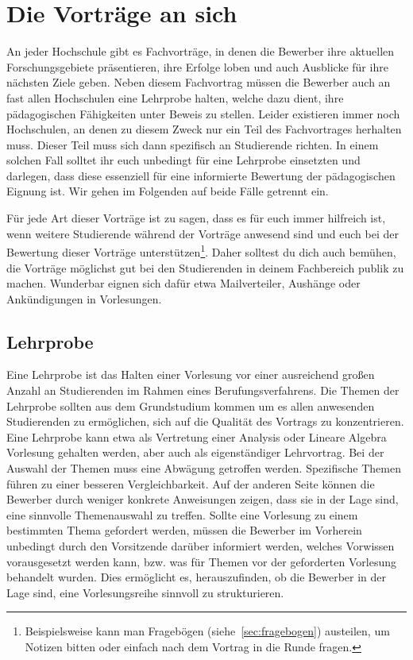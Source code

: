 \section{Die Vorträge an sich}
An jeder Hochschule gibt es Fachvorträge, in denen die Bewerber ihre aktuellen Forschungsgebiete präsentieren, ihre Erfolge loben und auch Ausblicke für ihre nächsten Ziele geben. Neben diesem Fachvortrag müssen die Bewerber auch an fast allen Hochschulen eine Lehrprobe halten, welche dazu dient, ihre pädagogischen Fähigkeiten unter Beweis zu stellen. Leider existieren immer noch Hochschulen, an denen zu diesem Zweck nur ein Teil des Fachvortrages herhalten muss. Dieser Teil muss sich dann spezifisch an Studierende richten. In einem solchen Fall solltet ihr euch unbedingt für eine Lehrprobe einsetzten und darlegen, dass diese essenziell für eine informierte Bewertung der pädagogischen Eignung ist. Wir gehen im Folgenden auf beide Fälle getrennt ein.

Für jede Art dieser Vorträge ist zu sagen, dass es für euch immer hilfreich ist, wenn weitere Studierende während der Vorträge anwesend sind und euch bei der Bewertung dieser Vorträge unterstützen\footnote{Beispielsweise kann man Fragebögen (siehe~\ref{sec:fragebogen}) austeilen, um Notizen bitten oder einfach nach dem Vortrag in die Runde fragen.}. Daher solltest du dich auch bemühen, die Vorträge möglichst gut bei den Studierenden in deinem Fachbereich publik zu machen. Wunderbar eignen sich dafür etwa Mailverteiler, Aushänge oder Ankündigungen in Vorlesungen.

\subsection{Lehrprobe}
Eine Lehrprobe ist das Halten einer Vorlesung vor einer ausreichend großen Anzahl an Studierenden im Rahmen eines Berufungsverfahrens. Die Themen der Lehrprobe sollten aus dem Grundstudium kommen um es allen anwesenden Studierenden zu ermöglichen, sich auf die Qualität des Vortrags zu konzentrieren. Eine Lehrprobe kann etwa als Vertretung einer Analysis oder Lineare Algebra Vorlesung gehalten werden, aber auch als eigenständiger Lehrvortrag. Bei der Auswahl der Themen muss eine Abwägung getroffen werden. Spezifische Themen führen zu einer besseren Vergleichbarkeit. Auf der anderen Seite können die Bewerber durch weniger konkrete Anweisungen zeigen, dass sie in der Lage sind, eine sinnvolle Themenauswahl zu treffen. Sollte eine Vorlesung zu einem bestimmten Thema gefordert werden, müssen die Bewerber im Vorherein unbedingt durch den Vorsitzende darüber informiert werden, welches Vorwissen vorausgesetzt werden kann, bzw. was für Themen vor der geforderten Vorlesung behandelt wurden. Dies ermöglicht es, herauszufinden, ob die Bewerber in der Lage sind, eine Vorlesungsreihe sinnvoll zu strukturieren.

